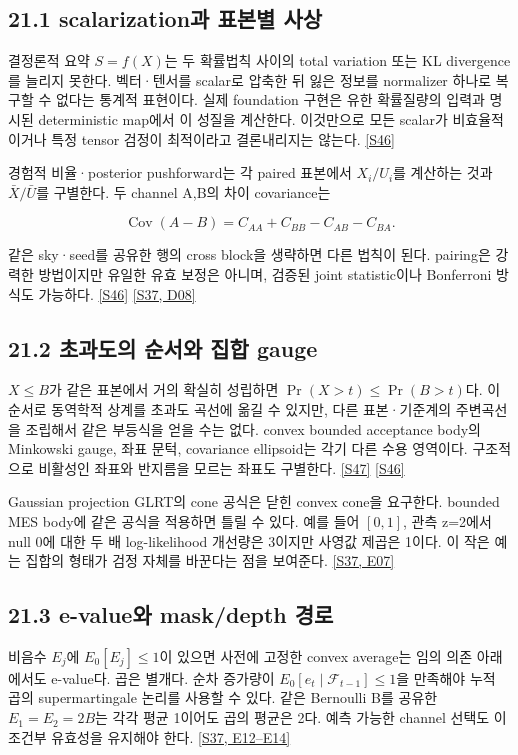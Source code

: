 \documentclass[11pt,a4paper]{article}
\begin{document}
\subsection*{21.1 scalarization과 표본별 사상}

결정론적 요약 \(S=f(X)\)는 두 확률법칙 사이의 total variation 또는 KL divergence를 늘리지 못한다. 벡터·텐서를 scalar로 압축한 뒤 잃은 정보를 normalizer 하나로 복구할 수 없다는 통계적 표현이다. 실제 foundation 구현은 유한 확률질량의 입력과 명시된 deterministic map에서 이 성질을 계산한다. 이것만으로 모든 scalar가 비효율적이거나 특정 tensor 검정이 최적이라고 결론내리지는 않는다. \hyperlink{src:S46}{[S46]}


경험적 비율·posterior pushforward는 각 paired 표본에서 \(X_i/U_i\)를 계산하는 것과 \(\bar X/\bar U\)를 구별한다. 두 channel A,B의 차이 covariance는


\[
\operatorname{Cov}(A-B)=C_{AA}+C_{BB}-C_{AB}-C_{BA}.
\]

같은 sky·seed를 공유한 행의 cross block을 생략하면 다른 법칙이 된다. pairing은 강력한 방법이지만 유일한 유효 보정은 아니며, 검증된 joint statistic이나 Bonferroni 방식도 가능하다. \hyperlink{src:S46}{[S46]} \hyperlink{src:S37}{[S37, D08]}


\subsection*{21.2 초과도의 순서와 집합 gauge}

\(X\le B\)가 같은 표본에서 거의 확실히 성립하면 \(\Pr(X>t)\le\Pr(B>t)\)다. 이 순서로 동역학적 상계를 초과도 곡선에 옮길 수 있지만, 다른 표본·기준계의 주변곡선을 조립해서 같은 부등식을 얻을 수는 없다. convex bounded acceptance body의 Minkowski gauge, 좌표 문턱, covariance ellipsoid는 각기 다른 수용 영역이다. 구조적으로 비활성인 좌표와 반지름을 모르는 좌표도 구별한다. \hyperlink{src:S47}{[S47]} \hyperlink{src:S46}{[S46]}


Gaussian projection GLRT의 cone 공식은 닫힌 convex cone을 요구한다. bounded MES body에 같은 공식을 적용하면 틀릴 수 있다. 예를 들어 \([0,1]\), 관측 z=2에서 null 0에 대한 두 배 log-likelihood 개선량은 3이지만 사영값 제곱은 1이다. 이 작은 예는 집합의 형태가 검정 자체를 바꾼다는 점을 보여준다. \hyperlink{src:S37}{[S37, E07]}


\subsection*{21.3 e-value와 mask/depth 경로}

비음수 \(E_j\)에 \(E_0[E_j]\le1\)이 있으면 사전에 고정한 convex average는 임의 의존 아래에서도 e-value다. 곱은 별개다. 순차 증가량이 \(E_0[e_t\mid\mathcal F_{t-1}]\le1\)을 만족해야 누적 곱의 supermartingale 논리를 사용할 수 있다. 같은 Bernoulli B를 공유한 \(E_1=E_2=2B\)는 각각 평균 1이어도 곱의 평균은 2다. 예측 가능한 channel 선택도 이 조건부 유효성을 유지해야 한다. \hyperlink{src:S37}{[S37, E12–E14]}
\end{document}
